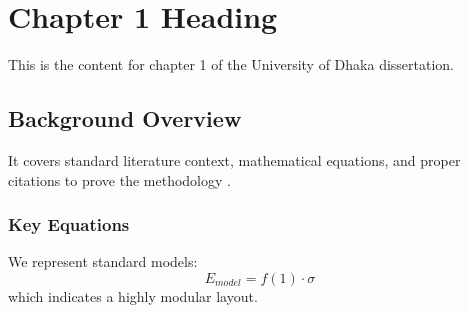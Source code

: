 \chapter{Chapter 1 Heading}
\label{ch:chapter1}
This is the content for chapter 1 of the University of Dhaka dissertation.

\section{Background Overview}
It covers standard literature context, mathematical equations, and proper citations to prove the methodology \cite{texbook}.

\subsection{Key Equations}
We represent standard models:
\begin{equation}
    E_{model} = f(1) \cdot \sigma
\end{equation}
which indicates a highly modular layout.
